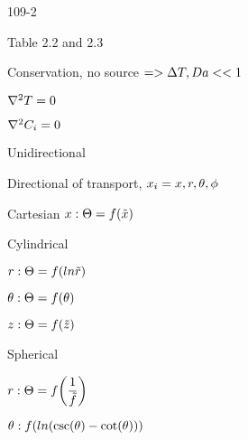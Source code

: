\begin{mitframe}{109-2}
\begin{listone}
	\item Table 2.2 and 2.3
    \item Conservation, no source $=>\iipf\Temp, \damkohler<<1$
    	\begin{listtwo}
        	\item $\nabla^2\Temp=0$
            \item $\nabla^2\conc_{\state}=0$
        \end{listtwo}
\item Unidirectional
		\begin{listtwo}
        	\item Directional of transport, $\specfrac{i}=\disp,\pos,\theta,\eleccoeff$
            \item Cartesian $\disp:\dimltemp=\fug(\tilde{\disp})$
            \item Cylindrical
            	\begin{listthree}
                	\item $\pos: \dimltemp=\fug(ln\tilde{\pos})$
                    \item $\theta:\dimltemp=\fug(\theta)$
                    \item $z:\dimltemp=\fug(\tilde{z})$
                \end{listthree}
        \item Spherical
        		\begin{listthree}
                	\item $\pos:\dimltemp=\fug\bigg(\dfrac{1}{\tilde{\fug}}\bigg)$
                    \item $\theta:\fug(ln(\csc(\theta)-\cot(\theta)))$
                \end{listthree}
        \end{listtwo}
\end{listone}        
\end{mitframe}